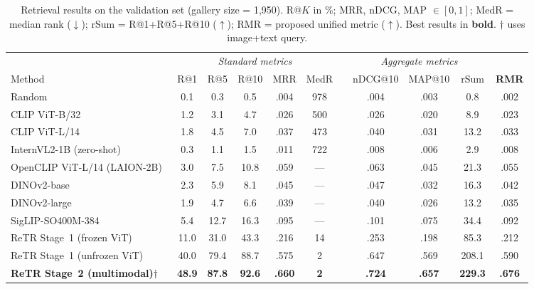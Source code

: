 \documentclass[10pt,twocolumn]{article}
\begin{document}
\begin{table}[t]
\centering
\caption{Retrieval results on the validation set (gallery size = 1{,}950).
         R@$K$ in \%; MRR, nDCG, MAP $\in [0,1]$; MedR = median rank ($\downarrow$);
         rSum = R@1+R@5+R@10 ($\uparrow$); RMR = proposed unified metric ($\uparrow$).
         Best results in \textbf{bold}. $\dagger$ uses image+text query.}
\label{tab:main}
\begin{tabular}{@{}l*{5}{c}c*{3}{c}c@{}}
\toprule
 & \multicolumn{5}{c}{\textit{Standard metrics}} & &
   \multicolumn{3}{c}{\textit{Aggregate metrics}} \\
\cmidrule(r){2-6} \cmidrule(l){8-10}
Method & R@1 & R@5 & R@10 & MRR & MedR &\quad& nDCG@10 & MAP@10 & rSum & \textbf{RMR} \\
\midrule
Random                        & 0.1  & 0.3  & 0.5  & .004 & 978 && .004 & .003 & 0.8   & .002 \\
CLIP ViT-B/32~\cite{radford2021clip}
                              & 1.2  & 3.1  & 4.7  & .026 & 500 && .026 & .020 & 8.9   & .023 \\
CLIP ViT-L/14~\cite{radford2021clip}
                              & 1.8  & 4.5  & 7.0  & .037 & 473 && .040 & .031 & 13.2  & .033 \\
InternVL2-1B (zero-shot)      & 0.3  & 1.1  & 1.5  & .011 & 722 && .008 & .006 & 2.9   & .008 \\
OpenCLIP ViT-L/14 (LAION-2B)~\cite{cherti2023openclip}
                              & 3.0  & 7.5  & 10.8 & .059 & ---  && .063 & .045 & 21.3  & .055 \\
DINOv2-base~\cite{oquab2024dinov2}    & 2.3  & 5.9  & 8.1  & .045 & ---  && .047 & .032 & 16.3  & .042 \\
DINOv2-large~\cite{oquab2024dinov2}   & 1.9  & 4.7  & 6.6  & .039 & ---  && .040 & .026 & 13.2  & .035 \\
SigLIP-SO400M-384~\cite{zhai2023siglip}
                              & 5.4  & 12.7 & 16.3 & .095 & ---  && .101 & .075 & 34.4  & .092 \\
\midrule
ReTR Stage~1 (frozen ViT)     & 11.0 & 31.0 & 43.3 & .216 & 14  && .253 & .198 & 85.3  & .212 \\
ReTR Stage~1 (unfrozen ViT)   & 40.0 & 79.4 & 88.7 & .575 & 2   && .647 & .569 & 208.1 & .590 \\
\textbf{ReTR Stage~2 (multimodal)$\dagger$}
  & \textbf{48.9} & \textbf{87.8} & \textbf{92.6}
  & \textbf{.660} & \textbf{2}
  && \textbf{.724} & \textbf{.657} & \textbf{229.3}
  & \textbf{.676} \\
\bottomrule
\end{tabular}
\end{table}
\end{document}
